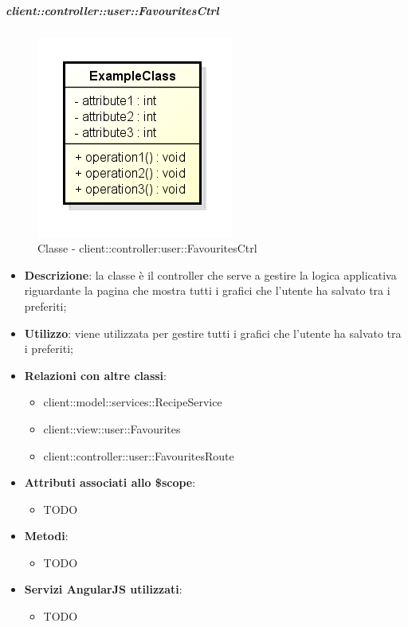		\subparagraph{client::controller::user::FavouritesCtrl} %
		\label{subp:client_controller_user_favouritesctrl}
			\begin{figure}[htbp]
				\centering
				\centerline{\includegraphics[scale=0.7]{./images/client/classes/example_class.png}}
				\caption{Classe - client::controller:user::FavouritesCtrl}
			\end{figure}
			\begin{itemize}
				\item \textbf{Descrizione}: la classe è il controller che serve a gestire la logica applicativa riguardante la pagina che mostra tutti i grafici che l'utente ha salvato tra i preferiti;
				\item \textbf{Utilizzo}: viene utilizzata per gestire tutti i grafici che l'utente ha salvato tra i preferiti;
				\item \textbf{Relazioni con altre classi}:
					\begin{itemize}
						\item client::model::services::RecipeService
						\item client::view::user::Favourites
						\item client::controller::user::FavouritesRoute
					\end{itemize}

				\item \textbf{Attributi associati allo \$scope}:
					\begin{itemize}
						\item TODO
					\end{itemize}

				\item \textbf{Metodi}:
					\begin{itemize}
						\item TODO
					\end{itemize}

				\item \textbf{Servizi AngularJS utilizzati}:
					\begin{itemize}
						\item TODO
					\end{itemize}

			\end{itemize}

